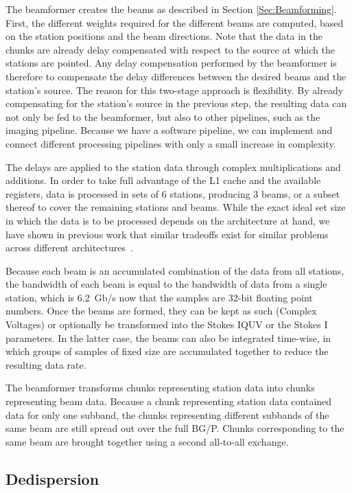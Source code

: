 \documentclass{llncs}
\begin{document}
The beamformer creates the beams as described in Section \ref{Sec:Beamforming}. First, the different weights required for the different beams are computed, based on the station positions and the beam directions. Note that the data in the chunks are already delay compensated with respect to the source at which the stations are pointed. Any delay compensation performed by the beamformer is therefore to compensate the delay differences between the desired beams and the station's source. The reason for this two-stage approach is flexibility. By already compensating for the station's source in the previous step, the resulting data can not only be fed to the beamformer, but also to other pipelines, such as the imaging pipeline. Because we have a software pipeline, we can implement and connect different processing pipelines with only a small increase in complexity.

The delays are applied to the station data through complex multiplications and additions. In order to take full advantage of the L1 cache and the available registers, data is processed in sets of 6 stations, producing 3 beams, or a subset thereof to cover the remaining stations and beams. While the exact ideal set size in which the data is to be processed depends on the architecture at hand, we have shown in previous work that similar tradeoffs exist for similar problems across different architectures~\cite{FOO,BAR}.

Because each beam is an accumulated combination of the data from all stations, the bandwidth of each beam is equal to the bandwidth of data from a single station, which is 6.2~Gb/s now that the samples are 32-bit floating point numbers. Once the beams are formed, they can be kept as such (Complex Voltages) or optionally be transformed into the Stokes IQUV or the Stokes I parameters. In the latter case, the beams can also be integrated time-wise, in which groups of samples of fixed size are accumulated together to reduce the resulting data rate.

The beamformer transforms chunks representing station data into chunks representing beam data. Because a chunk representing station data contained data for only one subband, the chunks representing different subbands of the same beam are still spread out over the full BG/P. Chunks corresponding to the same beam are brought together using a second all-to-all exchange.

\subsection{Dedispersion}
\end{document}
